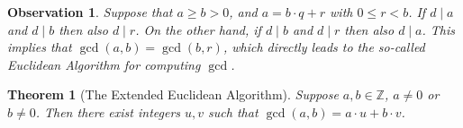 \documentclass[10pt,varwidth=6in,margin=0.2in,preview]{standalone}
\newtheorem*{_theorem}{Theorem}
\newtheorem*{_observation}{Observation}
\begin{document}
\begin{flushleft}
\begin{_observation} Suppose that $a \ge b > 0$, and $a = b \cdot q + r$ with $0 \le r < b$. If $d \mid a$ and $d \mid b$ then also $d \mid r$. On the other hand, if $d \mid b$ and $d \mid r$ then also $d \mid a$. This implies that $\gcd(a, b) = \gcd(b, r)$, which directly leads to the so-called Euclidean Algorithm for computing $\gcd$.
\end{_observation}


\begin{_theorem}[The Extended Euclidean Algorithm]
Suppose $a, b \in \mathbb{Z}$, $a \neq 0$ or $b \neq 0$. Then there exist integers $u, v$ such that $\gcd(a, b) = a \cdot u + b \cdot v$.
\end{_theorem}


\end{flushleft}
\end{document}
